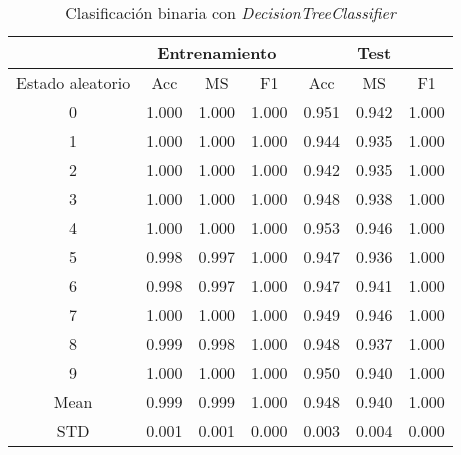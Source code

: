 \begin{table}[th]
	\centering
	\begin{tabular}{ |c|c|c|c|c|c|c| }
		\hline
		\rowcolor{LightCyan}
		 & \multicolumn{3}{c|}{Entrenamiento} & \multicolumn{3}{c|}{Test} \\
		\hline
		\rowcolor{LightCyan}
		 Estado aleatorio & Acc & MS & F1 & Acc & MS & F1 \\
		\hline
		0 & 1.000 & 1.000 & 1.000 & 0.951 & 0.942 & 1.000 \\
		1 & 1.000 & 1.000 & 1.000 & 0.944 & 0.935 & 1.000 \\
		2 & 1.000 & 1.000 & 1.000 & 0.942 & 0.935 & 1.000 \\
		3 & 1.000 & 1.000 & 1.000 & 0.948 & 0.938 & 1.000 \\
		4 & 1.000 & 1.000 & 1.000 & 0.953 & 0.946 & 1.000 \\
		5 & 0.998 & 0.997 & 1.000 & 0.947 & 0.936 & 1.000 \\
		6 & 0.998 & 0.997 & 1.000 & 0.947 & 0.941 & 1.000 \\
		7 & 1.000 & 1.000 & 1.000 & 0.949 & 0.946 & 1.000 \\
		8 & 0.999 & 0.998 & 1.000 & 0.948 & 0.937 & 1.000 \\
		9 & 1.000 & 1.000 & 1.000 & 0.950 & 0.940 & 1.000 \\
		Mean & 0.999 & 0.999 & 1.000 & 0.948 & 0.940 & 1.000 \\
		STD & 0.001 & 0.001 & 0.000 & 0.003 & 0.004 & 0.000 \\
		\hline
	\end{tabular}
	\caption{Clasificación binaria con \textit{DecisionTreeClassifier}}
	\label{tabla:dt_bin}
\end{table}
